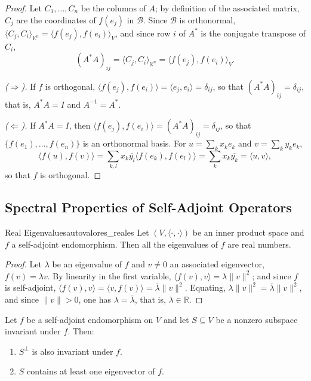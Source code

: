 \documentclass[11pt, a4paper]{article}
\begin{document}
\begin{proof}
Let $C_1, \dots, C_n$ be the columns of $A$; by definition of the associated matrix, $C_j$ are the coordinates of $f(e_j)$ in $\mathcal{B}$. Since $\mathcal{B}$ is orthonormal, $\langle C_j, C_i \rangle_{\mathbb{K}^n} = \langle f(e_j), f(e_i) \rangle_V$, and since row $i$ of $A^*$ is the conjugate transpose of $C_i$,
\[ (A^* A)_{ij} = \langle C_j, C_i \rangle_{\mathbb{K}^n} = \langle f(e_j), f(e_i) \rangle_V. \]

\textit{($\Rightarrow$).} If $f$ is orthogonal, $\langle f(e_j), f(e_i) \rangle = \langle e_j, e_i \rangle = \delta_{ij}$, so that $(A^* A)_{ij} = \delta_{ij}$, that is, $A^* A = I$ and $A^{-1} = A^*$.

\textit{($\Leftarrow$).} If $A^* A = I$, then $\langle f(e_j), f(e_i) \rangle = (A^* A)_{ij} = \delta_{ij}$, so that $\{f(e_1), \dots, f(e_n)\}$ is an orthonormal basis. For $u = \sum_k x_k e_k$ and $v = \sum_k y_k e_k$,
\[ \langle f(u), f(v) \rangle = \sum_{k,l} x_k \overline{y_l} \langle f(e_k), f(e_l) \rangle = \sum_k x_k \overline{y_k} = \langle u, v \rangle, \]
so that $f$ is orthogonal.
\end{proof}

\subsection{Spectral Properties of Self-Adjoint Operators}

\begin{teorema}{Real Eigenvalues}{autovalores_reales}
Let $(V, \langle \cdot, \cdot \rangle)$ be an inner product space and $f$ a self-adjoint endomorphism.
Then all the eigenvalues of $f$ are real numbers.
\end{teorema}

\begin{proof}
Let $\lambda$ be an eigenvalue of $f$ and $v \neq 0$ an associated eigenvector, $f(v) = \lambda v$. By linearity in the first variable, $\langle f(v), v \rangle = \lambda \|v\|^2$; and since $f$ is self-adjoint, $\langle f(v), v \rangle = \langle v, f(v) \rangle = \overline{\lambda} \|v\|^2$. Equating, $\lambda \|v\|^2 = \overline{\lambda} \|v\|^2$, and since $\|v\| > 0$, one has $\lambda = \overline{\lambda}$, that is, $\lambda \in \mathbb{R}$.
\end{proof}

\begin{lema}\label{lema_invariancia}
Let $f$ be a self-adjoint endomorphism on $V$ and let $S \subseteq V$ be a nonzero subspace invariant under $f$. Then:
\begin{enumerate}
    \item[i)] $S^\perp$ is also invariant under $f$.
    \item[ii)] $S$ contains at least one eigenvector of $f$.
\end{enumerate}
\end{lema}
\end{document}

